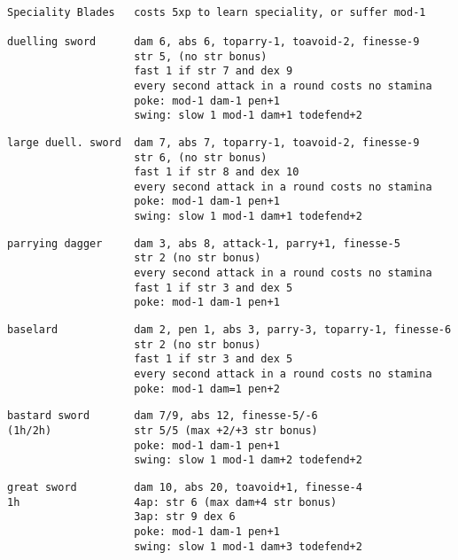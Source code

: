 \

\goodbreak \small \begin{samepage} \begin{verbatim}
Speciality Blades   costs 5xp to learn speciality, or suffer mod-1

duelling sword      dam 6, abs 6, toparry-1, toavoid-2, finesse-9
                    str 5, (no str bonus)
                    fast 1 if str 7 and dex 9
                    every second attack in a round costs no stamina
                    poke: mod-1 dam-1 pen+1
                    swing: slow 1 mod-1 dam+1 todefend+2
\end{verbatim} \blocklistgap \begin{verbatim}
large duell. sword  dam 7, abs 7, toparry-1, toavoid-2, finesse-9
                    str 6, (no str bonus)
                    fast 1 if str 8 and dex 10
                    every second attack in a round costs no stamina
                    poke: mod-1 dam-1 pen+1
                    swing: slow 1 mod-1 dam+1 todefend+2
\end{verbatim} \blocklistgap \begin{verbatim}
parrying dagger     dam 3, abs 8, attack-1, parry+1, finesse-5
                    str 2 (no str bonus)
                    every second attack in a round costs no stamina
                    fast 1 if str 3 and dex 5
                    poke: mod-1 dam-1 pen+1
\end{verbatim} \blocklistgap \begin{verbatim}
baselard            dam 2, pen 1, abs 3, parry-3, toparry-1, finesse-6
                    str 2 (no str bonus)
                    fast 1 if str 3 and dex 5
                    every second attack in a round costs no stamina
                    poke: mod-1 dam=1 pen+2
\end{verbatim} \blocklistgap \begin{verbatim}
bastard sword       dam 7/9, abs 12, finesse-5/-6
(1h/2h)             str 5/5 (max +2/+3 str bonus)
                    poke: mod-1 dam-1 pen+1
                    swing: slow 1 mod-1 dam+2 todefend+2
\end{verbatim} \blocklistgap \begin{verbatim}
great sword         dam 10, abs 20, toavoid+1, finesse-4
1h                  4ap: str 6 (max dam+4 str bonus)
                    3ap: str 9 dex 6
                    poke: mod-1 dam-1 pen+1
                    swing: slow 1 mod-1 dam+3 todefend+2
\end{verbatim} \blocklistgap \begin{verbatim}

\end{verbatim}
\end{samepage}
